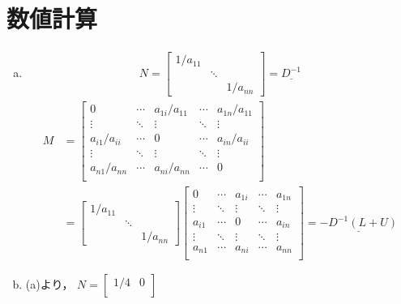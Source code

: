 \documentclass{jsarticle}
\theoremstyle{definition}
\begin{document}
  \section{数値計算}
  \begin{enumerate}[(a)]
    \item
    \begin{align*}
      N = 
      \begin{bmatrix}
        1/a_{11} & & \\
        & \ddots & \\
        & & 1/a_{nn}
      \end{bmatrix}
      = \underline{D^{-1}}
    \end{align*}
    \begin{align*}
      M &=
      \begin{bmatrix}
        0 & \cdots & a_{1i}/a_{11}  & \cdots & a_{1n}/a_{11} \\
        \vdots & \ddots  & \vdots  & \ddots & \vdots \\
        a_{i1}/a_{ii} & \cdots  & 0  & \cdots & a_{in}/a_{ii} \\
        \vdots & \ddots &  \vdots & \ddots & \vdots \\
        a_{n1}/a_{nn} & \cdots & a_{ni}/a_{nn} & \cdots & 0 \\
      \end{bmatrix} \\
      &=
      \begin{bmatrix}
        1/a_{11} & & \\
        & \ddots & \\
        & & 1/a_{nn}
      \end{bmatrix}
      \begin{bmatrix}
        0 & \cdots & a_{1i} & \cdots & a_{1n} \\
        \vdots & \ddots & \vdots & \ddots & \vdots \\
        a_{i1} & \cdots & 0  & \cdots & a_{in} \\
        \vdots & \ddots & \vdots & \ddots & \vdots \\
        a_{n1} & \cdots & a_{ni} & \cdots & a_{nn} \\
      \end{bmatrix}
      = \underline{-D^{-1}(L+U)}
    \end{align*}
    \item (a)より，
    \begin{math}
      N=
      \begin{bmatrix}
        1/4 & 0 \\

\end{bmatrix}
\end{math}
\end{enumerate}
\end{document}
